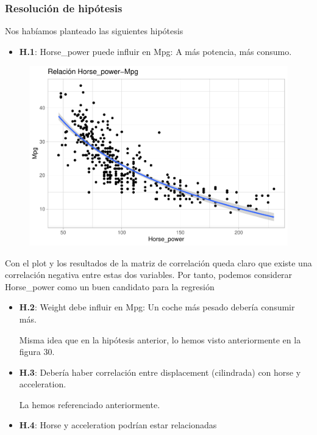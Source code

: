 \subsubsection{Resolución de hipótesis}

Nos habíamos planteado las siguientes hipótesis

\begin{itemize}
\item \textbf{H.1}: Horse\_power puede influir en Mpg: A más potencia, más consumo.
\end{itemize}

\begin{figure}[H]\center\includegraphics[width=.56\linewidth]{img/EDA_files/figure-latex/unnamed-chunk-27-1} \caption{}\end{figure}

Con el plot y los resultados de la matriz de correlación queda claro que existe una correlación negativa entre estas dos variables. Por tanto, podemos considerar Horse\_power como un buen candidato para la regresión

\begin{itemize}
\item \textbf{H.2}: Weight debe influir en Mpg: Un coche más pesado debería consumir más. 

Misma idea que en la hipótesis anterior, lo hemos visto anteriormente en la figura 30.

\item \textbf{H.3}: Debería haber correlación entre displacement (cilindrada) con horse y acceleration. 

La hemos referenciado anteriormente.

\item \textbf{H.4}: Horse y acceleration podrían estar relacionadas
\end{itemize}

